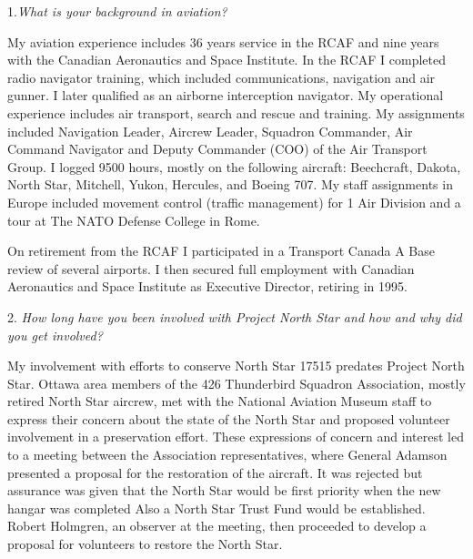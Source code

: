 \begin{multicols}{2}

1.\textit{What is your background in aviation?}

My aviation experience includes 36 years service in the RCAF and nine
years with the Canadian Aeronautics and Space Institute. In the RCAF I
completed radio navigator training, which included communications,
navigation and air gunner. I later qualified as an airborne
interception navigator. My operational experience includes air
transport, search and rescue and training. My assignments included
Navigation Leader, Aircrew Leader, Squadron Commander, Air Command
Navigator and Deputy Commander (COO) of the Air Transport Group. I
logged 9500 hours, mostly on the following aircraft: Beechcraft,
Dakota, North Star, Mitchell, Yukon, Hercules, and Boeing 707. My
staff assignments in Europe included movement control (traffic
management) for 1 Air Division and a tour at The NATO Defense College
in Rome. 

On retirement from the RCAF I participated in a Transport
Canada A Base review of several airports. I then secured full
employment with Canadian Aeronautics and Space Institute as Executive
Director, retiring in 1995.

2. \textit{How long have you been involved with Project North Star and how and why did you get involved?}

My involvement with efforts to conserve North Star 17515 predates
Project North Star. Ottawa area members of the 426 Thunderbird Squadron
Association, mostly retired North Star aircrew, met with the National
Aviation Museum staff to express their concern about the state of the
North Star and proposed volunteer involvement in a preservation effort.
These expressions of concern and interest led to a meeting between the
Association representatives, where General Adamson presented a proposal
for the restoration of the aircraft. It was rejected but assurance was
given that the North Star would be first priority when the new hangar
was completed Also a North Star Trust Fund would be established. Robert
Holmgren, an observer at the meeting, then proceeded to develop a
proposal for volunteers to restore the North Star.



\end{multicols}
